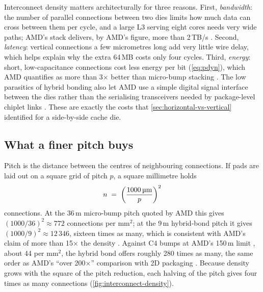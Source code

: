 Interconnect density matters architecturally for three reasons. First, \emph{bandwidth}: the number of parallel connections between two dies limits how much data can cross between them per cycle, and a large L3 serving eight cores needs very wide paths; AMD's stack delivers, by AMD's figure, more than 2\,TB/s \cite[slide~20]{wuu2022vcache}. Second, \emph{latency}: vertical connections a few micrometres long add very little wire delay, which helps explain why the extra 64\,MB costs only four cycles. Third, \emph{energy}: short, low-capacitance connections cost less energy per bit (\cref{eq:pdyn}), which AMD quantifies as more than 3$\times$ better than micro-bump stacking \cite[slide~15]{wuu2022vcache}. The low parasitics of hybrid bonding also let AMD use a simple digital signal interface between the dies rather than the serialising transceivers needed by package-level chiplet links \cite[slide~26]{wuu2022vcache}. These are exactly the costs that \cref{sec:horizontal-vs-vertical} identified for a side-by-side cache die.

\subsection{What a finer pitch buys}
\label{sec:density-example}
Pitch is the distance between the centres of neighbouring connections. If pads are laid out on a square grid of pitch $p$, a square millimetre holds
\begin{equation}
  n \;=\; \left(\frac{1000\,\text{\textmu m}}{p}\right)^{2}
  \label{eq:pad-density}
\end{equation}
connections. At the 36\,\textmu m micro-bump pitch quoted by AMD this gives $(1000/36)^2 \approx 772$ connections per mm$^2$; at the 9\,\textmu m hybrid-bond pitch it gives $(1000/9)^2 \approx 12\,346$, sixteen times as many, which is consistent with AMD's claim of more than 15$\times$ the density \cite{swaminathanAdvancedPackagingEnabling2021}. Against C4 bumps at AMD's 150\,\textmu m limit \cite[slide~13]{lambertHeterogenousIntegrationHigh2025}, about 44 per mm$^2$, the hybrid bond offers roughly 280 times as many, the same order as AMD's ``over 200$\times$'' comparison with 2D packaging \cite{amd2022epyc7003}. Because density grows with the square of the pitch reduction, each halving of the pitch gives four times as many connections (\cref{fig:interconnect-density}).

